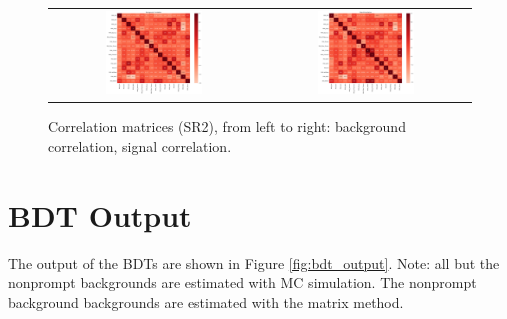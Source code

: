 \begin{figure}[tbh!]
 \begin{center}
 \begin{tabular}{cc}
  \includegraphics[width=0.48\textwidth]{figures/Part3/BDT/corr_bkg_SR2}&
  \includegraphics[width=0.48\textwidth]{figures/Part3/BDT/corr_signal_SR2}\\
 \end{tabular}
 \caption{Correlation matrices (SR2), from left to right: background correlation, signal correlation.}
 \label{fig:Ranking}
 \end{center}
\end{figure}

\section{BDT Output}
\label{sec:Output}

The output of the BDTs are shown in Figure \ref{fig:bdt_output}. Note: all but the nonprompt backgrounds are estimated with MC simulation. The nonprompt background backgrounds are estimated with the matrix method.

